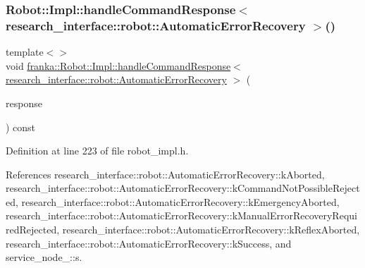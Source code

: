 \subsubsection{\texorpdfstring{Robot\+::\+Impl\+::handle\+Command\+Response$<$ research\+\_\+interface\+::robot\+::\+Automatic\+Error\+Recovery $>$()}{Robot::Impl::handleCommandResponse< research\_interface::robot::AutomaticErrorRecovery >()}}
{\footnotesize\ttfamily template$<$$>$ \\
void \hyperlink{classfranka_1_1Robot_1_1Impl_ac281e9292f59718758b2c9897b004776}{franka\+::\+Robot\+::\+Impl\+::handle\+Command\+Response}$<$ \hyperlink{structresearch__interface_1_1robot_1_1AutomaticErrorRecovery}{research\+\_\+interface\+::robot\+::\+Automatic\+Error\+Recovery} $>$ (\begin{DoxyParamCaption}\item[{const \hyperlink{structresearch__interface_1_1robot_1_1CommandBase_ae8b503e2bc7d72e70b6eb08421e0d853}{research\+\_\+interface\+::robot\+::\+Automatic\+Error\+Recovery\+::\+Response} \&}]{response }\end{DoxyParamCaption}) const\hspace{0.3cm}{\ttfamily [inline]}}



Definition at line 223 of file robot\+\_\+impl.\+h.



References research\+\_\+interface\+::robot\+::\+Automatic\+Error\+Recovery\+::k\+Aborted, research\+\_\+interface\+::robot\+::\+Automatic\+Error\+Recovery\+::k\+Command\+Not\+Possible\+Rejected, research\+\_\+interface\+::robot\+::\+Automatic\+Error\+Recovery\+::k\+Emergency\+Aborted, research\+\_\+interface\+::robot\+::\+Automatic\+Error\+Recovery\+::k\+Manual\+Error\+Recovery\+Required\+Rejected, research\+\_\+interface\+::robot\+::\+Automatic\+Error\+Recovery\+::k\+Reflex\+Aborted, research\+\_\+interface\+::robot\+::\+Automatic\+Error\+Recovery\+::k\+Success, and service\+\_\+node\+\_\+::s.


